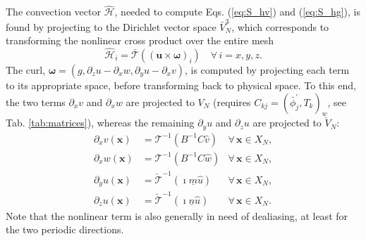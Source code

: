 \documentclass[preprint]{elsarticle}
\newcommand{\N}[1]{\check{#1}}
\newcommand{\D}[1]{\bar{#1}}
\begin{document}
The convection vector $\bm{\hat{\mathcal{H}}}$, needed to compute Eqs. (\ref{eq:S_hv}) and (\ref{eq:S_hg}), is found by projecting to the Dirichlet vector space $\D{V}_N^3$, which corresponds to transforming the nonlinear cross product over the entire mesh
\begin{equation}
\bm{\hat{\mathcal{H}}}_i = \mathcal{\D{T}}((\bm{u} \times \bm{\omega})_i) \quad \forall \, i=x,y,z. \label{eq:H_hat}
\end{equation}
The curl, $\bm{\omega} = (g, \partial_z u - \partial_x w, \partial_y u - 
\partial_x v)$, is computed by projecting each term to its appropriate space, before transforming back to physical space. 
To this end, the two terms $\partial_x v$ and $\partial_x w$ are projected to 
$V_N$ (requires $C_{kj} = (\D{\phi}_j^{'}, T_k)_w$, see Tab. \ref{tab:matrices}), whereas the remaining $\partial_y u$ and $\partial_z u$ are projected to 
$\N{V}_N$:
\begin{align}
 \partial_x v(\bm{x}) &= \mathcal{T}^{-1}(B^{-1}C\hat{v}) &\forall \, \bm{x} \in X_N, \\
 \partial_x w(\bm{x}) &= \mathcal{T}^{-1}(B^{-1}C\hat{w}) &\forall \, \bm{x} \in X_N, \\
 \partial_y u(\bm{x}) &= \N{\mathcal{T}}^{-1}(\imath \underline{m}\hat{u}) &\forall \, \bm{x} \in X_N, \\
 \partial_z u(\bm{x}) &= \N{\mathcal{T}}^{-1}(\imath \underline{n}\hat{u}) &\forall \, \bm{x} \in X_N.
\end{align}
Note that the nonlinear term is also generally in need of 
dealiasing, at least for the two periodic directions.
\end{document}
